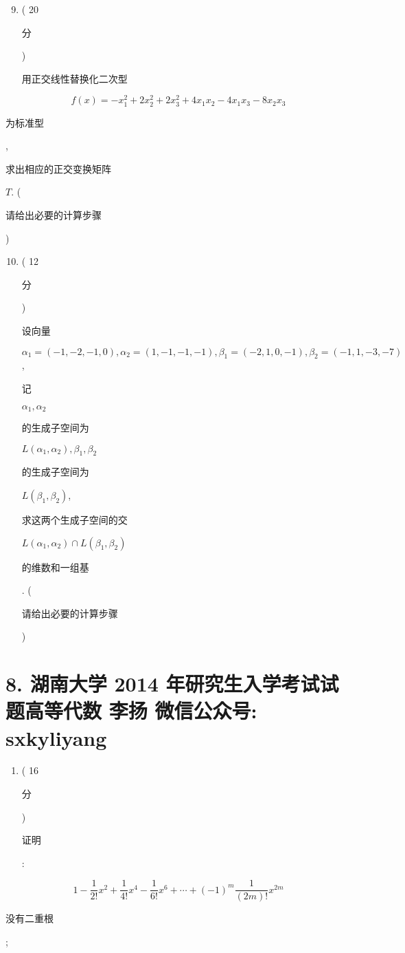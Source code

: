 \documentclass[10pt]{article}
\begin{document}
\begin{enumerate}
  \setcounter{enumi}{8}
  \item ( 20 \begin{CJK}{UTF8}{mj}分\end{CJK}) \begin{CJK}{UTF8}{mj}用正交线性替换化二次型\end{CJK}
\end{enumerate}
$$
f(x)=-x_{1}^{2}+2 x_{2}^{2}+2 x_{3}^{2}+4 x_{1} x_{2}-4 x_{1} x_{3}-8 x_{2} x_{3}
$$
\begin{CJK}{UTF8}{mj}为标准型\end{CJK}, \begin{CJK}{UTF8}{mj}求出相应的正交变换矩阵\end{CJK} $T$. (\begin{CJK}{UTF8}{mj}请给出必要的计算步骤\end{CJK})

\begin{enumerate}
  \setcounter{enumi}{9}
  \item ( 12 \begin{CJK}{UTF8}{mj}分\end{CJK}) \begin{CJK}{UTF8}{mj}设向量\end{CJK} $\alpha_{1}=(-1,-2,-1,0), \alpha_{2}=(1,-1,-1,-1), \beta_{1}=(-2,1,0,-1), \beta_{2}=(-1,1,-3,-7)$, \begin{CJK}{UTF8}{mj}记\end{CJK} $\alpha_{1}, \alpha_{2}$ \begin{CJK}{UTF8}{mj}的生成子空间为\end{CJK} $L\left(\alpha_{1}, \alpha_{2}\right), \beta_{1}, \beta_{2}$ \begin{CJK}{UTF8}{mj}的生成子空间为\end{CJK} $L\left(\beta_{1}, \beta_{2}\right)$, \begin{CJK}{UTF8}{mj}求这两个生成子空间的交\end{CJK} $L\left(\alpha_{1}, \alpha_{2}\right) \cap L\left(\beta_{1}, \beta_{2}\right)$ \begin{CJK}{UTF8}{mj}的维数和一组基\end{CJK}. (\begin{CJK}{UTF8}{mj}请给出必要的计算步骤\end{CJK})
\end{enumerate}
\section{8. 湖南大学 2014 年研究生入学考试试题高等代数 
 李扬 
 微信公众号: sxkyliyang}
\begin{enumerate}
  \item ( 16 \begin{CJK}{UTF8}{mj}分\end{CJK}) \begin{CJK}{UTF8}{mj}证明\end{CJK}:
\end{enumerate}
$$
1-\frac{1}{2 !} x^{2}+\frac{1}{4 !} x^{4}-\frac{1}{6 !} x^{6}+\cdots+(-1)^{m} \frac{1}{(2 m) !} x^{2 m}
$$
\begin{CJK}{UTF8}{mj}没有二重根\end{CJK};
\end{document}
